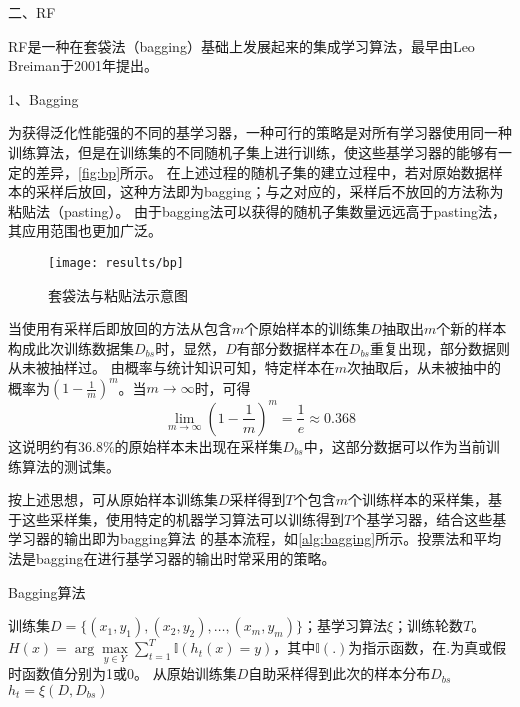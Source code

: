 二、RF

RF是一种在套袋法（bagging）基础上发展起来的集成学习算法，最早由Leo Breiman于2001年提出\cite{breiman2001}。

1、Bagging

为获得泛化性能强的不同的基学习器，一种可行的策略是对所有学习器使用同一种训练算法，但是在训练集的不同随机子集上进行训练，使这些基学习器的能够有一定的差异，\autoref{fig:bp}所示。
在上述过程的随机子集的建立过程中，若对原始数据样本的采样后放回，这种方法即为bagging；与之对应的，采样后不放回的方法称为粘贴法（pasting）\cite{Aurélien2018,Zhou2016}。
由于bagging法可以获得的随机子集数量远远高于pasting法，其应用范围也更加广泛。
\begin{figure}[htbp]
      \centering
      \texttt{[image: results/bp]}
      \caption[套袋法与粘贴法示意图]{\label{fig:bp}套袋法与粘贴法示意图\cite{Aurélien2018}}
\end{figure}

当使用有采样后即放回的方法从包含$m$个原始样本的训练集$D$抽取出$m$个新的样本构成此次训练数据集$D_{bs}$时，显然，$D$有部分数据样本在$D_{bs}$重复出现，部分数据则从未被抽样过。
由概率与统计知识可知，特定样本在$m$次抽取后，从未被抽中的概率为$(1-\frac{1}{m})^m$。当$m \to \infty$时，可得
\begin{equation}
      \label{equ:me}
      \lim_{m \to \infty}{(1-\frac{1}{m})}^m = \frac{1}{e} \approx 0.368
\end{equation}
这说明约有36.8\%的原始样本未出现在采样集$D_{bs}$中，这部分数据可以作为当前训练算法的测试集。

按上述思想，可从原始样本训练集$D$采样得到$T$个包含$m$个训练样本的采样集，基于这些采样集，使用特定的机器学习算法可以训练得到$T$个基学习器，结合这些基学习器的输出即为bagging算法
的基本流程，如\autoref{alg:bagging}所示。投票法和平均法是bagging在进行基学习器的输出时常采用的策略。
\begin{breakablealgorithm}
      \caption[Bagging算法]{Bagging算法\cite{Zhou2016}}
      \label{alg:bagging}
      \begin{algorithmic}[1] %
            \Require 训练集$D=\{(x_1,y_1),(x_2,y_2),\dots,(x_m,y_m)\}$；基学习算法$\xi$；训练轮数$T$。
            \Ensure $H(x)=\arg \max \limits_{y \in Y} \sum_{t=1}^T \mathbb{I}(h_t(x)=y)$，其中$\mathbb{I}(.)$为指示函数，在$.$为真或假时函数值分别为1或0。
                  \State 从原始训练集$D$自助采样得到此次的样本分布$D_{bs}$
                  \State $h_t=\xi (D,D_{bs})$
            \EndFor
      \end{algorithmic}
\end{breakablealgorithm}

